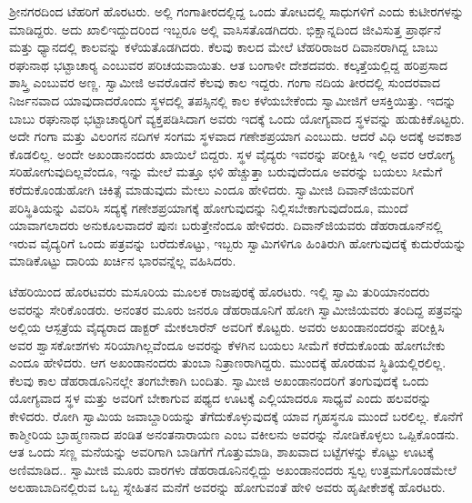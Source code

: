 ಶ‍್ರೀನಗರದಿಂದ ಟೆಹರಿಗೆ ಹೊರಟರು. ಅಲ್ಲಿ ಗಂಗಾತೀರದಲ್ಲಿದ್ದ ಒಂದು ತೋಟದಲ್ಲಿ ಸಾಧುಗಳಿಗೆ ಎಂದು ಕುಟೀರಗಳನ್ನು ಮಾಡಿದ್ದರು. ಅದು ಖಾಲಿ\break ಇದ್ದುದರಿಂದ ಇಬ್ಬರೂ ಅಲ್ಲಿ ವಾಸಿಸತೊಡಗಿದರು. ಭಿಕ್ಷಾನ್ನದಿಂದ ಜೀವಿಸುತ್ತ ಪ್ರಾರ್ಥನೆ ಮತ್ತು ಧ್ಯಾನದಲ್ಲಿ ಕಾಲವನ್ನು ಕಳೆಯತೊಡಗಿದರು. ಕೆಲವು ಕಾಲದ ಮೇಲೆ ಟೆಹರಿರಾಜರ ದಿವಾನರಾಗಿದ್ದ ಬಾಬು ರಘುನಾಥ ಭಟ್ಟಾಚಾರ‍್ಯ ಎಂಬುವರ ಪರಿಚಯವಾಯಿತು. ಆತ ಬಂಗಾಳೀ ದೇಶದವರು. ಕಲ್ಕತ್ತೆಯಲ್ಲಿದ್ದ ಹರಿಪ್ರಸಾದ ಶಾಸ್ತ್ರಿ ಎಂಬುವರ ಅಣ್ಣ. ಸ್ವಾಮೀಜಿ ಅವರೊಡನೆ ಕೆಲವು ಕಾಲ ಇದ್ದರು. ಗಂಗಾ ನದಿಯ ತೀರದಲ್ಲಿ ಸುಂದರವಾದ ನಿರ್ಜನವಾದ ಯಾವುದಾದರೊಂದು ಸ್ಥಳದಲ್ಲಿ ತಪಸ್ಸಿನಲ್ಲಿ ಕಾಲ ಕಳೆಯಬೇಕೆಂದು ಸ್ವಾಮೀಜಿಗೆ ಆಸಕ್ತಿಯಿತ್ತು. ಇದನ್ನು ಬಾಬು ರಘುನಾಥ ಭಟ್ಟಾಚಾರ‍್ಯರಿಗೆ ವ್ಯಕ್ತಪಡಿಸಿದಾಗ ಅವರು ಇದಕ್ಕೆ ಒಂದು ಯೋಗ್ಯವಾದ ಸ್ಥಳವನ್ನು ಹುಡುಕಿಕೊಟ್ಟರು. ಅದೇ ಗಂಗಾ ಮತ್ತು ವಿಲಂಗನ ನದಿಗಳ ಸಂಗಮ ಸ್ಥಳವಾದ ಗಣೇಶಪ್ರಯಾಗ ಎಂಬುದು. ಆದರೆ ವಿಧಿ ಅದಕ್ಕೆ ಅವಕಾಶ ಕೊಡಲಿಲ್ಲ. ಅಂದೇ ಅಖಂಡಾನಂದರು ಖಾಯಿಲೆ ಬಿದ್ದರು. ಸ್ಥಳ ವೈದ್ಯರು ಇವರನ್ನು ಪರೀಕ್ಷಿಸಿ ಇಲ್ಲಿ ಅವರ ಆರೋಗ್ಯ ಸರಿಹೋಗುವುದಿಲ್ಲವೆಂದೂ, ಇನ್ನು ಮೇಲೆ ಮತ್ತೂ ಛಳಿ ಹೆಚ್ಚುತ್ತಾ ಬರುವುದೆಂದೂ ಅವರನ್ನು ಬಯಲು ಸೀಮೆಗೆ ಕರೆದುಕೊಂಡುಹೋಗಿ ಚಿಕಿತ್ಸೆ ಮಾಡುವುದು ಮೇಲು ಎಂದೂ ಹೇಳಿದರು. ಸ್ವಾಮೀಜಿ ದಿವಾನ್‍ಜಿಯವರಿಗೆ ಪರಿಸ್ಥಿತಿಯನ್ನು ವಿವರಿಸಿ ಸದ್ಯಕ್ಕೆ ಗಣೇಶಪ್ರಯಾಗಕ್ಕೆ ಹೋಗುವುದನ್ನು ನಿಲ್ಲಿಸಬೇಕಾಗುವುದೆಂದೂ, ಮುಂದೆ ಯಾವಾಗಲಾದರು ಅನುಕೂಲವಾದರೆ ಪುನಃ ಬರುತ್ತೇನೆಂದೂ ಹೇಳಿದರು. ದಿವಾನ್‍ಜಿಯವರು ಡೆಹರಾಡೂನ್‍ನಲ್ಲಿ ಇರುವ ವೈದ್ಯರಿಗೆ ಒಂದು ಪತ್ರವನ್ನು ಬರೆದುಕೊಟ್ಟು, ಇಬ್ಬರು ಸ್ವಾಮಿಗಳಿಗೂ ಹಿಂತಿರುಗಿ ಹೋಗುವುದಕ್ಕೆ ಕುದುರೆಯನ್ನು ಮಾಡಿಕೊಟ್ಟು ದಾರಿಯ ಖರ್ಚಿನ ಭಾರವನ್ನೆಲ್ಲ ವಹಿಸಿದರು. 

ಟೆಹರಿಯಿಂದ ಹೊರಟವರು ಮಸೂರಿಯ ಮೂಲಕ ರಾಜಪುರಕ್ಕೆ ಹೊರಟರು. ಇಲ್ಲಿ ಸ್ವಾಮಿ ತುರಿಯಾನಂದರು ಅವರನ್ನು ಸೇರಿಕೊಂಡರು. ಅನಂತರ ಮೂರು ಜನರೂ ಡೆಹರಾಡೂನಿಗೆ ಹೋಗಿ ಸ್ವಾಮೀಜಿಯವರು ತಂದಿದ್ದ ಪತ್ರವನ್ನು ಅಲ್ಲಿಯ ಆಸ್ಪತ್ರೆಯ ವೈದ್ಯರಾದ ಡಾಕ್ಟರ್ ಮೇಕಲಾರೆನ್ ಅವರಿಗೆ ಕೊಟ್ಟರು. ಅವರು ಅಖಂಡಾನಂದರನ್ನು ಪರೀಕ್ಷಿಸಿ ಅವರ ಶ್ವಾಸಕೋಶಗಳು ಸರಿಯಾಗಿಲ್ಲವೆಂದೂ ಅವರನ್ನು ಕೆಳಗಿನ ಬಯಲು ಸೀಮೆಗೆ ಕರೆದುಕೊಂಡು ಹೋಗಬೇಕು ಎಂದೂ ಹೇಳಿದರು. ಆಗ ಅಖಂಡಾನಂದರು ತುಂಬಾ ನಿತ್ರಾಣರಾಗಿದ್ದರು. ಮುಂದಕ್ಕೆ ಹೊರಡುವ ಸ್ಥಿತಿಯಲ್ಲಿರಲಿಲ್ಲ. ಕೆಲವು ಕಾಲ ಡೆಹರಾಡೂನಿನಲ್ಲೇ ತಂಗಬೇಕಾಗಿ ಬಂದಿತು. ಸ್ವಾಮೀಜಿ ಅಖಂಡಾನಂದರಿಗೆ ತಂಗುವುದಕ್ಕೆ ಒಂದು ಯೋಗ್ಯವಾದ ಸ್ಥಳ ಮತ್ತು ಅವರಿಗೆ ಬೇಕಾಗುವ ಪಥ್ಯದ ಊಟಕ್ಕೆ ಎಲ್ಲಿಯಾದರೂ ಸಾಧ್ಯವೆ ಎಂದು ಹಲವರನ್ನು ಕೇಳಿದರು. ರೋಗಿ ಸ್ವಾಮಿಯ ಜವಾಬ್ದಾರಿಯನ್ನು ತೆಗೆದುಕೊಳ್ಳುವುದಕ್ಕೆ ಯಾವ ಗೃಹಸ್ಥನೂ ಮುಂದೆ ಬರಲಿಲ್ಲ. ಕೊನೆಗೆ ಕಾಶ್ಮೀರಿಯ ಬ್ರಾಹ್ಮಣನಾದ ಪಂಡಿತ ಅನಂತನಾರಾಯಣ ಎಂಬ ವಕೀಲನು ಅವರನ್ನು ನೋಡಿಕೊಳ್ಳಲು ಒಪ್ಪಿಕೊಂಡನು. ಆತ ಒಂದು ಸಣ್ಣ ಮನೆಯನ್ನು ಅವರಿಗಾಗಿ ಬಾಡಿಗೆಗೆ ಗೊತ್ತುಮಾಡಿ, ಶಾಖವಾದ ಬಟ್ಟೆಗಳನ್ನು ಕೊಟ್ಟು ಊಟಕ್ಕೆ ಅಣಿಮಾಡಿದ.. ಸ್ವಾಮೀಜಿ ಮೂರು ವಾರಗಳು ಡೆಹರಾಡೂನಿನಲ್ಲಿದ್ದು ಅಖಂಡಾನಂದರು ಸ್ವಲ್ಪ ಉತ್ತಮಗೊಂಡಮೇಲೆ ಅಲಹಾಬಾದಿನಲ್ಲಿರುವ ಒಬ್ಬ ಸ್ನೇಹಿತನ ಮನೆಗೆ ಅವರನ್ನು ಹೋಗುವಂತೆ ಹೇಳಿ ಅವರು ಹೃಷೀಕೇಶಕ್ಕೆ ಹೊರಟರು. 

